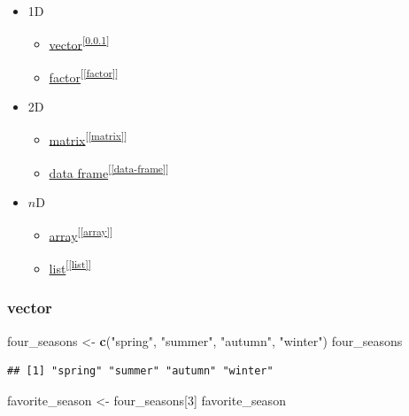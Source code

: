 \documentclass[
]{book}
\newenvironment{Shaded}{\begin{snugshade}}{\end{snugshade}}
\newcommand{\DecValTok}[1]{\textcolor[rgb]{0.00,0.00,0.81}{#1}}
\newcommand{\FunctionTok}[1]{\textcolor[rgb]{0.13,0.29,0.53}{\textbf{#1}}}
\newcommand{\NormalTok}[1]{#1}
\newcommand{\OtherTok}[1]{\textcolor[rgb]{0.56,0.35,0.01}{#1}}
\newcommand{\StringTok}[1]{\textcolor[rgb]{0.31,0.60,0.02}{#1}}
\providecommand{\tightlist}{%
  \setlength{\itemsep}{0pt}\setlength{\parskip}{0pt}}
\theoremstyle{definition}
\theoremstyle{definition}
\theoremstyle{definition}
\theoremstyle{definition}
\theoremstyle{remark}
\begin{document}
\begin{itemize}
\tightlist
\item
  1D

  \begin{itemize}
  \tightlist
  \item
    \protect\hyperlink{vector}{vector}\textsuperscript{{[}\ref{vector}{]}}
  \item
    \protect\hyperlink{factor}{factor}\textsuperscript{{[}\ref{factor}{]}}
  \end{itemize}
\item
  2D

  \begin{itemize}
  \tightlist
  \item
    \protect\hyperlink{matrix}{matrix}\textsuperscript{{[}\ref{matrix}{]}}
  \item
    \protect\hyperlink{data-frame}{data frame}\textsuperscript{{[}\ref{data-frame}{]}}
  \end{itemize}
\item
  \(n\)D

  \begin{itemize}
  \tightlist
  \item
    \protect\hyperlink{array}{array}\textsuperscript{{[}\ref{array}{]}}
  \item
    \protect\hyperlink{list}{list}\textsuperscript{{[}\ref{list}{]}}
  \end{itemize}
\end{itemize}

\hypertarget{vector}{%
\subsubsection{vector}\label{vector}}

\begin{Shaded}
\begin{Highlighting}[]
\NormalTok{four\_seasons }\OtherTok{\textless{}{-}} \FunctionTok{c}\NormalTok{(}\StringTok{"spring"}\NormalTok{, }\StringTok{"summer"}\NormalTok{, }\StringTok{"autumn"}\NormalTok{, }\StringTok{"winter"}\NormalTok{)}
\NormalTok{four\_seasons}
\end{Highlighting}
\end{Shaded}

\begin{verbatim}
## [1] "spring" "summer" "autumn" "winter"
\end{verbatim}

\begin{Shaded}
\begin{Highlighting}[]
\NormalTok{favorite\_season }\OtherTok{\textless{}{-}}\NormalTok{ four\_seasons[}\DecValTok{3}\NormalTok{]}
\NormalTok{favorite\_season}
\end{Highlighting}
\end{Shaded}
\end{document}
